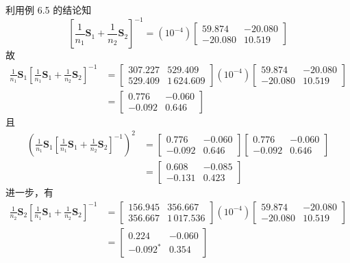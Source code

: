 利用例 6.5 的结论知
\[
\left[\frac{1}{n_1}\mathbf{S}_1+\frac{1}{n_2}\mathbf{S}_2\right]^{-1}=(10^{-4})\begin{bmatrix}59.874&-20.080\\-20.080&10.519\end{bmatrix}
\]
故
\begin{align*}
\frac{1}{n_1}\mathbf{S}_1\left[\frac{1}{n_1}\mathbf{S}_1+\frac{1}{n_2}\mathbf{S}_2\right]^{-1}&=\begin{bmatrix}307.227&529.409\\529.409&1\,624.609\end{bmatrix}(10^{-4})\begin{bmatrix}59.874&-20.080\\-20.080&10.519\end{bmatrix}\\
&=\begin{bmatrix}0.776&-0.060\\-0.092&0.646\end{bmatrix}
\end{align*}
且
\begin{align*}
\left(\frac{1}{n_1}\mathbf{S}_1\left[\frac{1}{n_1}\mathbf{S}_1+\frac{1}{n_2}\mathbf{S}_2\right]^{-1}\right)^2&=\begin{bmatrix}0.776&-0.060\\-0.092&0.646\end{bmatrix}\begin{bmatrix}0.776&-0.060\\-0.092&0.646\end{bmatrix}\\
&=\begin{bmatrix}0.608&-0.085\\-0.131&0.423\end{bmatrix}
\end{align*}
进一步，有
\begin{align*}
\frac{1}{n_2}\mathbf{S}_2\left[\frac{1}{n_1}\mathbf{S}_1+\frac{1}{n_2}\mathbf{S}_2\right]^{-1}&=\begin{bmatrix}156.945&356.667\\356.667&1\,017.536\end{bmatrix}(10^{-4})\begin{bmatrix}59.874&-20.080\\-20.080&10.519\end{bmatrix}\\
&=\begin{bmatrix}0.224&-0.060\\-0.092^{\ast}&0.354\end{bmatrix}
\end{align*}
